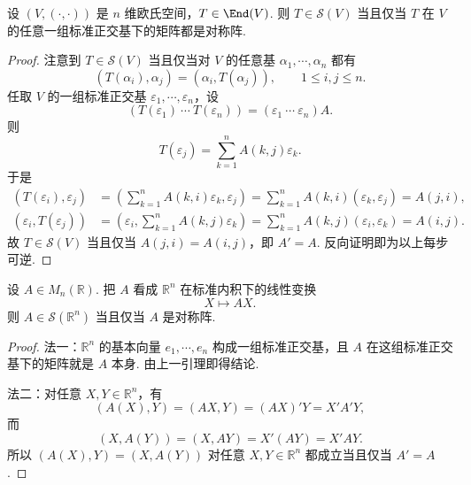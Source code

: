 \begin{lemma}
	设 $(V,(\cdot,\cdot))$ 是 $n$ 维欧氏空间，$T\in\End(V)$. 则 $T\in\mathcal{S}(V)$ 当且仅当 $T$ 在 $V$ 的任意一组标准正交基下的矩阵都是对称阵.
\end{lemma}
\begin{proof}
	注意到 $T\in\mathcal{S}(V)$ 当且仅当对 $V$ 的任意基 $\alpha_1,\cdots,\alpha_n$ 都有
	\[
	(T(\alpha_i),\alpha_j)=(\alpha_i,T(\alpha_j)),
	\qquad 1\leq i,j\leq n.
	\]
	任取 $V$ 的一组标准正交基 $\varepsilon_1,\cdots,\varepsilon_n$，设
	\[
	(T(\varepsilon_1)\ \cdots\ T(\varepsilon_n))=(\varepsilon_1\ \cdots\ \varepsilon_n)A.
	\]
	则
	\[
	T(\varepsilon_j)=\sum_{k=1}^{n}A(k,j)\varepsilon_k.
	\]
	于是
	\[
	\begin{aligned}
		(T(\varepsilon_i),\varepsilon_j)
		&=\left(\sum_{k=1}^{n}A(k,i)\varepsilon_k,\varepsilon_j\right)
		=\sum_{k=1}^{n}A(k,i)(\varepsilon_k,\varepsilon_j)=A(j,i),\\
		(\varepsilon_i,T(\varepsilon_j))
		&=\left(\varepsilon_i,\sum_{k=1}^{n}A(k,j)\varepsilon_k\right)
		=\sum_{k=1}^{n}A(k,j)(\varepsilon_i,\varepsilon_k)=A(i,j).
	\end{aligned}
	\]
	故 $T\in\mathcal{S}(V)$ 当且仅当 $A(j,i)=A(i,j)$，即 $A'=A$. 反向证明即为以上每步可逆.
\end{proof}

\begin{example}
	设 $A\in M_n(\mathbb{R})$. 把 $A$ 看成 $\mathbb{R}^n$ 在标准内积下的线性变换
	\[
	X\longmapsto AX.
	\]
	则 $A\in\mathcal{S}(\mathbb{R}^n)$ 当且仅当 $A$ 是对称阵.
\end{example}
\begin{proof}
	法一：$\mathbb{R}^n$ 的基本向量 $e_1,\cdots,e_n$ 构成一组标准正交基，且 $A$ 在这组标准正交基下的矩阵就是 $A$ 本身. 由上一引理即得结论.
	
	法二：对任意 $X,Y\in\mathbb{R}^n$，有
	\[
	(A(X),Y)=(AX,Y)=(AX)'Y=X'A'Y,
	\]
	而
	\[
	(X,A(Y))=(X,AY)=X'(AY)=X'AY.
	\]
	所以 $(A(X),Y)=(X,A(Y))$ 对任意 $X,Y\in\mathbb{R}^n$ 都成立当且仅当 $A'=A$.
\end{proof}

